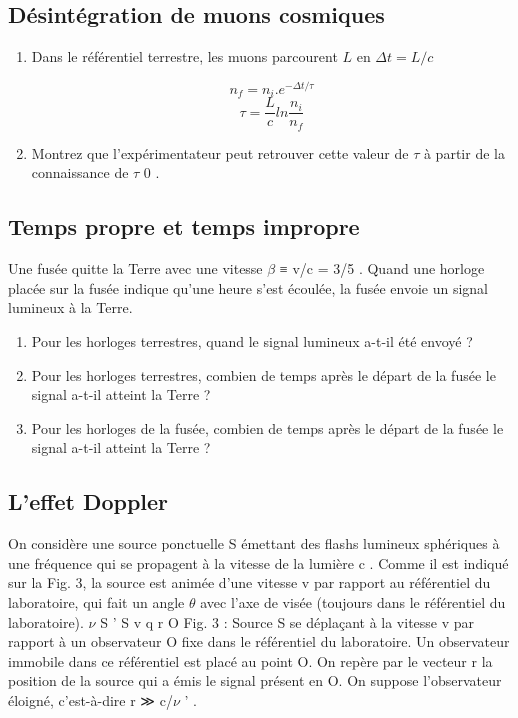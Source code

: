 \subsection{Désintégration de muons cosmiques}
\begin{enumerate}
  \item Dans le référentiel terrestre, les muons parcourent $L$ en $\Delta t = L/c$
  
\begin{minipage}[c]{.45\linewidth}
\begin{center}
\end{center}
\end{minipage}
\hfill
\begin{minipage}[c]{.45\linewidth}
\[
n_f = n_i . e^{-\Delta t / \tau}
\]
\[
\tau = \frac{L}{c}ln\frac{n_i}{n_f}
\]
\end{minipage}
  \item Montrez que l'expérimentateur peut retrouver cette valeur de $\tau$ à partir de la connaissance
de $\tau$ 0 .
\end{enumerate}
\subsection{Temps propre et temps impropre}
Une fusée quitte la Terre avec une vitesse $\beta$ ≡ v/c = 3/5 . Quand une horloge placée sur la
fusée indique qu'une heure s'est écoulée, la fusée envoie un signal lumineux à la Terre.
\begin{enumerate}
  \item Pour les horloges terrestres, quand le signal lumineux a-t-il été envoyé ?
  \item Pour les horloges terrestres, combien de temps après le départ de la fusée le signal a-t-il
atteint la Terre ?
  \item Pour les horloges de la fusée, combien de temps après le départ de la fusée le signal a-t-il
atteint la Terre ?
\end{enumerate}
\subsection{L'effet Doppler}
On considère une source ponctuelle S émettant des flashs lumineux sphériques à une fréquence
qui se propagent à la vitesse de la lumière c . Comme il est indiqué sur la Fig. 3, la source est
animée d'une vitesse v par rapport au référentiel du laboratoire, qui fait un angle $\theta$ avec l'axe
de visée (toujours dans le référentiel du laboratoire).
$\nu$ S '
S
v
q
r
O
Fig. 3 : Source S se déplaçant à la vitesse v par rapport à un observateur O fixe dans le référentiel
du laboratoire.
Un observateur immobile dans ce référentiel est placé au point O. On repère par le vecteur
r la position de la source qui a émis le signal présent en O. On suppose l'observateur éloigné,
c'est-à-dire r ≫ c/$\nu$ ' .
